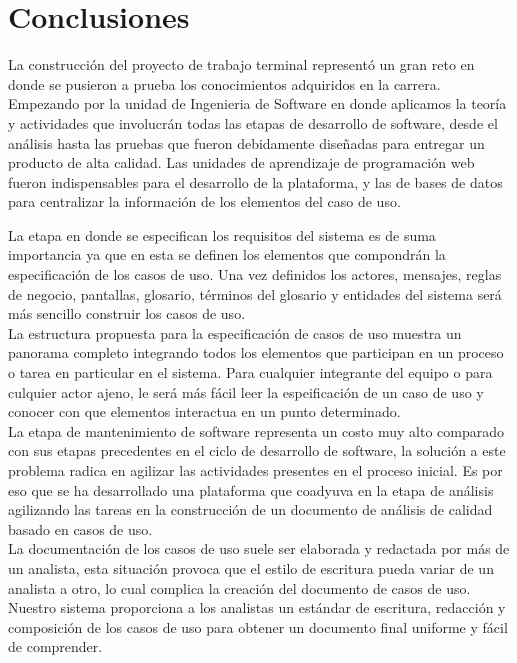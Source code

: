 \chapter{Conclusiones} \label{cap:diez}

La construcción del proyecto de trabajo terminal representó un gran reto en donde se pusieron a prueba los conocimientos adquiridos en la carrera. Empezando por la unidad de Ingenieria de Software en donde aplicamos la teoría y actividades que involucrán todas las etapas de desarrollo de software, desde el análisis hasta las pruebas que fueron debidamente diseñadas para entregar un producto de alta calidad. Las unidades de aprendizaje de programación web fueron indispensables para el desarrollo de la plataforma, y las de bases de datos para centralizar la información de los elementos del caso de uso.

La etapa en donde se especifican los requisitos del sistema es de suma importancia ya que en esta se definen los elementos que compondrán la especificación de los casos de uso. Una vez definidos los actores, mensajes, reglas de negocio, pantallas, glosario, términos del glosario y entidades del sistema será más sencillo construir los casos de uso.\\

La estructura propuesta para la especificación de casos de uso muestra un panorama completo integrando todos los elementos que participan en un proceso o tarea en particular en el sistema. Para cualquier integrante del equipo o para culquier actor ajeno, le será más fácil leer la espeificación de un caso de uso y conocer con que elementos interactua en un punto determinado.\\

La etapa de mantenimiento de software representa un costo muy alto comparado con sus etapas precedentes en el ciclo de desarrollo de software, la solución a este problema radica en agilizar las actividades presentes en el proceso inicial. Es por eso que se ha desarrollado una plataforma que coadyuva en la etapa de análisis agilizando las tareas en la construcción de un documento de análisis de calidad basado en casos de uso.\\

La documentación de los casos de uso suele ser elaborada y redactada por más de un analista, esta situación provoca que el estilo de escritura pueda variar de un analista a otro, lo cual complica la creación del documento de casos de uso. Nuestro sistema proporciona a los analistas un estándar de escritura, redacción y composición de los casos de uso para obtener un documento final uniforme y fácil de comprender.\\

